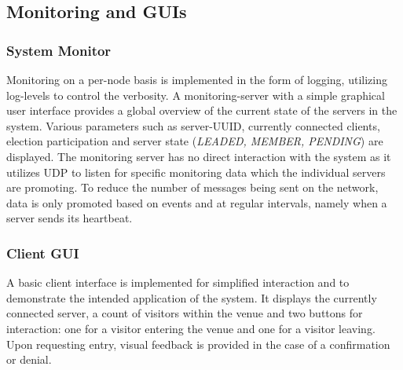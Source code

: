 \documentclass[runningheads]{llncs}
\begin{document}
\subsection{Monitoring and GUIs}

\subsubsection{System Monitor}
Monitoring on a per-node basis is implemented in the form of logging, utilizing log-levels to control the verbosity. A monitoring-server with a simple graphical user interface provides a global overview of the current state of the servers in the system. Various parameters such as server-UUID, currently connected clients, election participation and server state (\textit{LEADED, MEMBER, PENDING}) are displayed. The monitoring server has no direct interaction with the system as it utilizes UDP to listen for specific monitoring data which the individual servers are promoting. To reduce the number of messages being sent on the network, data is only promoted based on events and at regular intervals, namely when a server sends its heartbeat.

\subsubsection{Client GUI}
A basic client interface is implemented for simplified interaction and to demonstrate the intended application of the system. It displays the currently connected server, a count of visitors within the venue and two buttons for interaction: one for a visitor entering the venue and one for a visitor leaving. Upon requesting entry, visual feedback is provided in the case of a confirmation or denial.
\end{document}

